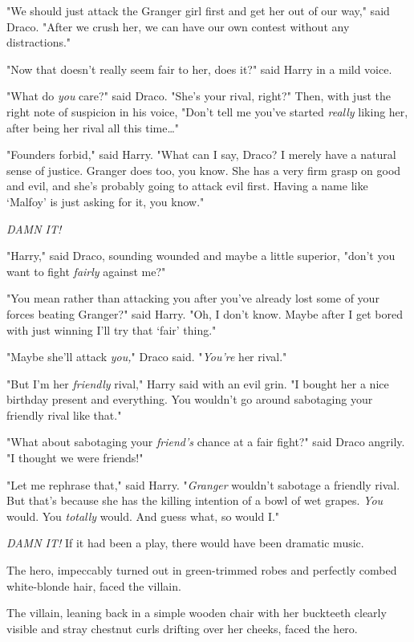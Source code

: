 "We should just attack the Granger girl first and get her out of our way," said
Draco. "After we crush her, we can have our own contest without any
distractions."

"Now that doesn't really seem fair to her, does it?" said Harry in a mild voice.

"What do \emph{you} care?" said Draco. "She's your rival, right?" Then, with
just the right note of suspicion in his voice, "Don't tell me you've started
\emph{really} liking her, after being her rival all this time…"

"Founders forbid," said Harry. "What can I say, Draco? I merely have a natural
sense of justice. Granger does too, you know. She has a very firm grasp on good
and evil, and she's probably going to attack evil first. Having a name like
`Malfoy' is just asking for it, you know."

\emph{DAMN IT!}

"Harry," said Draco, sounding wounded and maybe a little superior, "don't you
want to fight \emph{fairly} against me?"

"You mean rather than attacking you after you've already lost some of your
forces beating Granger?" said Harry. "Oh, I don't know. Maybe after I get bored
with just winning I'll try that `fair' thing."

"Maybe she'll attack \emph{you,}" Draco said. "\emph{You're} her rival."

"But I'm her \emph{friendly} rival," Harry said with an evil grin. "I bought
her a nice birthday present and everything. You wouldn't go around sabotaging
your friendly rival like that."

"What about sabotaging your \emph{friend's} chance at a fair fight?" said Draco
angrily. "I thought we were friends!"

"Let me rephrase that," said Harry. "\emph{Granger} wouldn't sabotage a
friendly rival. But that's because she has the killing intention of a bowl of
wet grapes. \emph{You} would. You \emph{totally} would. And guess what, so
would I."

\emph{DAMN IT!}
\later
If it had been a play, there would have been dramatic music.

The hero, impeccably turned out in green-trimmed robes and perfectly combed
white-blonde hair, faced the villain.

The villain, leaning back in a simple wooden chair with her buckteeth clearly
visible and stray chestnut curls drifting over her cheeks, faced the hero.

